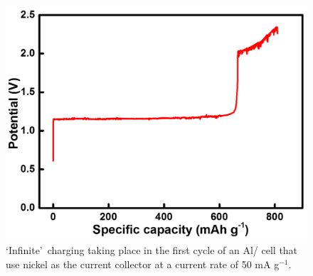 \begin{figure}[tbh!]
\centering
\includegraphics[width=\textwidth]{Figures/chap7fig/nickel}
\caption{\lq Infinite\rq\ charging taking place in the first cycle of an Al/ cell that use nickel as the current collector at a current rate of 50 mA g$^{-1}$.}
\label{Figures/chap7fig:nickel}
\end{figure}

